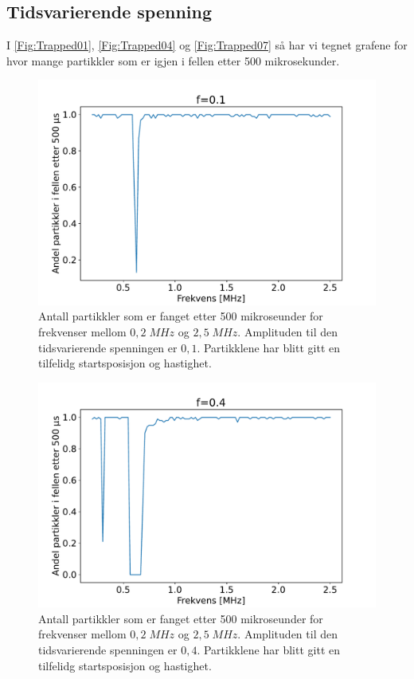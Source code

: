 \documentclass[reprint,english,notitlepage, nofootinbib]{revtex4-1}  %
\begin{document}
\subsection*{Tidsvarierende spenning}

I \autoref{Fig:Trapped01}, \autoref{Fig:Trapped04} og \autoref{Fig:Trapped07} så har vi tegnet grafene for hvor mange partikkler som er igjen i fellen etter 500 mikrosekunder. 

\begin{figure}[H]
\centering
\includegraphics[scale=0.4]{../Images/0Trapped.pdf}
\caption{Antall partikkler som er fanget etter 500 mikroseunder for frekvenser mellom $0,2 \; MHz$ og $2,5 \; MHz$. Amplituden til den tidsvarierende spenningen er $0,1$. Partikklene har blitt gitt en tilfelidg startsposisjon og hastighet.}
\label{Fig:Trapped01}
\end{figure}


\begin{figure}[H]
\centering
\includegraphics[scale=0.4]{../Images/1Trapped.pdf}
\caption{Antall partikkler som er fanget etter 500 mikroseunder for frekvenser mellom $0,2 \; MHz$ og $2,5 \; MHz$. Amplituden til den tidsvarierende spenningen er $0,4$. Partikklene har blitt gitt en tilfelidg startsposisjon og hastighet.}
\label{Fig:Trapped04}
\end{figure}
\end{document}
